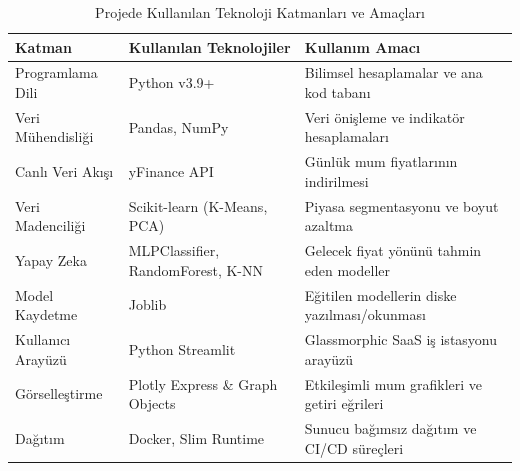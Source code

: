 \documentclass[12pt,a4paper]{report}
\begin{document}
\begin{table}[htbp]
    \centering
    \caption{Projede Kullanılan Teknoloji Katmanları ve Amaçları}
    \begin{tabular}{lll}
        \toprule
        \textbf{Katman} & \textbf{Kullanılan Teknolojiler} & \textbf{Kullanım Amacı} \\
        \midrule
        Programlama Dili & Python v3.9+ & Bilimsel hesaplamalar ve ana kod tabanı \\
        Veri Mühendisliği & Pandas, NumPy & Veri önişleme ve indikatör hesaplamaları \\
        Canlı Veri Akışı & yFinance API & Günlük mum fiyatlarının indirilmesi \\
        Veri Madenciliği & Scikit-learn (K-Means, PCA) & Piyasa segmentasyonu ve boyut azaltma \\
        Yapay Zeka & MLPClassifier, RandomForest, K-NN & Gelecek fiyat yönünü tahmin eden modeller \\
        Model Kaydetme & Joblib & Eğitilen modellerin diske yazılması/okunması \\
        Kullanıcı Arayüzü & Python Streamlit & Glassmorphic SaaS iş istasyonu arayüzü \\
        Görselleştirme & Plotly Express \& Graph Objects & Etkileşimli mum grafikleri ve getiri eğrileri \\
        Dağıtım & Docker, Slim Runtime & Sunucu bağımsız dağıtım ve CI/CD süreçleri \\
        \bottomrule
    \end{tabular}
    \label{tab:tech_stack}
\end{table}
\end{document}
